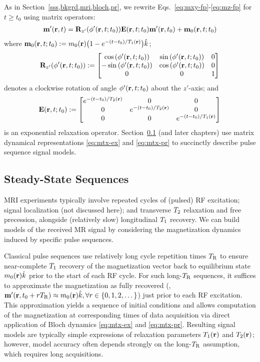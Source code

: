 As in Section~\ref{sss,bkgrd,mri,bloch,pr},
we rewrite Eqs.~\eqref{eq:mxy-fp}-\eqref{eq:mz-fp}
for $t\geq t_0$
using matrix operators:
\begin{align}
	\bmmp\prt = \bmRzp{\phprt} \bmE\prtzt{t} \bmmp\prtz 
		+ \bmmzero\prtzt{t} 
		\label{eq:mtx-pr}
\end{align}
where
$\bmmzero\prtzt{t} := \mzero\pr \paren{1-e^{-(t-t_0)/\To\pr}} \unit{k}$; 
\begin{align}
	\bmRzp{\phprt} :=
	\begin{bmatrix}
		\cosa{\phprt} & \sina{\phprt} & 0 \\
		-\sina{\phprt} & \cosa{\phprt} & 0 \\
		0 & 0 & 1
	\end{bmatrix}
	\label{eq:op-rotz}
\end{align}
denotes a clockwise rotation of angle $\phprt$ about the $z'$-axis; 
and
\begin{align}
	\bmE{\prtzt{t}} := 
	\begin{bmatrix}
		e^{-(t-t_0)/\Tt\pr} & 0 & 0 \\
		0 & e^{-(t-t_0)/\Tt\pr} & 0 \\
		0 & 0 & e^{-(t-t_0)/\To\pr} 
	\end{bmatrix}
	\label{eq:op-relax}
\end{align}
is an exponential relaxation operator.
Section~\ref{ss,bkgrd,mri,ss}
(and later chapters) 
use matrix dynamical representations
\eqref{eq:mtx-ex} and \eqref{eq:mtx-pr}
to succinctly describe pulse sequence
signal models.

\subsection{Steady-State Sequences}
\label{ss,bkgrd,mri,ss}

MRI experiments
typically involve 
repeated cycles of (pulsed) RF excitation;
signal localization (not discussed here);
and transverse $T_2$ relaxation and free precession, 
alongside (relatively slow) longitudinal $T_1$ recovery.
We can build models 
of the received MR signal
by considering the magnetization dynamics
induced by specific pulse sequences.

Classical pulse sequences
use relatively long cycle repetition times $T_\mathrm{R}$
to ensure near-complete $T_1$ recovery
of the magnetization vector
back to equilibrium state $\mzero\pr \unit{k}$
prior to the start of each RF cycle.
For such long-$T_\mathrm{R}$ sequences,
it suffices 
to approximate the magnetization
as fully recovered 
(\ie, $\bmmp\paren{\bmr,t_0 + \rep\TR} \approx \mzero\pr \unit{k}, 
\forall \rep\in\set{0,1,2,\dots}$)
just prior to each RF excitation.
This approximation
yields a sequence of initial conditions
and allows computation of the magnetization
at corresponding times of data acquisition
via direct application of Bloch dynamics
\eqref{eq:mtx-ex} and \eqref{eq:mtx-pr}.
Resulting signal models
are typically simple expressions
of relaxation parameters $\To\pr$ and $\Tt\pr$;
however, model accuracy often depends strongly
on the long-$T_\mathrm{R}$ assumption,
which requires long acquisitions.

